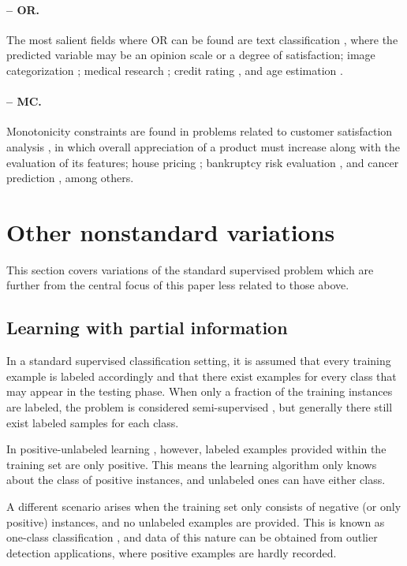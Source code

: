 \paragraph{-- OR.} The most salient fields where OR can be found are text classification \cite{aor-text}, where the predicted variable may be an opinion scale or a degree of satisfaction; image categorization \cite{aor-image}; medical research \cite{aor-medical}; credit rating \cite{aor-credit}, and age estimation \cite{aor-age}.

\paragraph{-- MC.} Monotonicity constraints are found in problems related to customer satisfaction analysis \cite{amc-customer}, in which overall appreciation of a product must increase along with the evaluation of its features; house pricing \cite{mc-trees}; bankruptcy risk evaluation \cite{amc-bank}, and cancer prediction \cite{amc-cancer}, among others.

\section{Other nonstandard variations}
\label{p3sec:othervariations}

This section covers variations of the standard supervised problem which are further from the central focus of this paper less related to those above. 

\subsection{Learning with partial information}
\label{p3sec:partial}


In a standard supervised classification setting, it is assumed that every training example is labeled accordingly and that there exist examples for every class that may appear in the testing phase. When only a fraction of the training instances are labeled, the problem is considered semi-supervised , but generally there still exist labeled samples for each class.

In positive-unlabeled learning , however, labeled examples provided within the training set are only positive. This means the learning algorithm only knows about the class of positive instances, and unlabeled ones can have either class. 

A different scenario arises when the training set only consists of negative (or only positive) instances, and no unlabeled examples are provided. This is known as one-class classification , and data of this nature can be obtained from outlier detection applications, where positive examples are hardly recorded.

